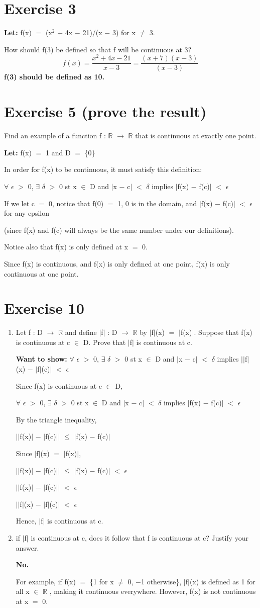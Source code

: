 \documentclass{article}
\newcommand{\mt}[1]{\ensuremath{#1}}
\newcommand\bsc[2][\DefaultOpt]{%
  \def\DefaultOpt{#2}%
  \section[#1]{#2}%
}
\newcommand{\balist}{\begin{enumerate}[label=\alph*.]}
\newcommand{\elist}{\end{enumerate}}
\newcommand{\lt}[1]{\textbf{Let: } #1}
\newcommand{\wts}[1]{\textbf{Want to show: } #1}
\newcommand{\br}{\mt{\mathbb{R}} }       %
\newcommand{\ep}{\mt{\epsilon} }         %
\newcommand{\fa}{\mt{\forall} }          %
\newcommand{\dta}{\mt{\delta} }
\newcommand{\mem}{\mt{\in} }
\newcommand{\exs}{\mt{\exists} }
\newcommand{\lra}{ \mt{\longrightarrow} } %
\newcommand{\av}[1]{\mt{|}#1\mt{|}}  %
\newcommand{\prn}[1]{(#1)}
\newcommand{\bk}[1]{\{#1\}}
\newcommand{\ps}{\mt{+} }
\newcommand{\ms}{\mt{-} }
\newcommand{\ls}{\mt{<} }
\newcommand{\gr}{\mt{>} }
\newcommand{\lse}{\mt{\leq} }
\newcommand{\eql}{\mt{=} }
\newcommand{\uf}[2]{#1\mt{^{#2}}}
\newcommand{\eqn}[1]{\[#1\]}
\begin{document}
\bsc{Exercise 3}{

\lt{f(x) \eql \prn{\uf{x}{2} \ps 4x \ms 21}/\prn{x \ms 3} for x $\neq$ 3.}

How should f(3) be defined so that f will be continuous at 3?
\eqn{f(x) = \frac{x^2 + 4x - 21}{x - 3} = \frac{(x + 7)(x - 3)}{(x - 3)}}
\textbf{f(3) should be defined as 10.}

}

\newpage

\bsc{Exercise 5 (prove the result)}{

Find an example of a function f : \br \lra \br that is continuous at exactly one point.

\lt{f(x) \eql 1 and D \eql \bk{0}}

In order for f(x) to be continuous, it must satisfy this definition:

\fa \ep \gr 0, \exs \dta \gr 0 st x \mem D and \av{x \ms c} \ls \dta implies \av{f(x) \ms f(c)} \ls \ep

If we let c \eql 0, notice that f(0) \eql 1, 0 is in the domain, and \av{f(x) \ms f(c)} \ls \ep for any epsilon

(since f(x) and f(c) will always be the same number under our definitions).

Notice also that f(x) is only defined at x \eql 0.

Since f(x) is continuous, and f(x) is only defined at one point, f(x) is only continuous at one point.
}

\bsc{Exercise 10}{

\balist
\item Let f : D \lra \br and define \av{f} : D \lra \br by \av{f}(x) \eql \av{f(x)}. Suppose that f(x) is continuous at c \mem D. Prove that \av{f} is continuous at c.
	
	\wts{\fa \ep \gr 0, \exs \dta \gr 0 st x \mem D and \av{x \ms c} \ls \dta implies \av{\av	{f}(x) \ms \av{f}(c)} \ls \ep}
	
	Since f(x) is continuous at c \mem D,
	
	\fa \ep \gr 0, \exs \dta \gr 0 st x \mem D and \av{x \ms c} \ls \dta implies \av{f(x) \ms f(c)} \ls \ep
	
	By the triangle inequality,
	
	\av{\av{f(x)} \ms \av{f(c)}} \lse \av{f(x) \ms f(c)}
	
	Since \av{f}(x) \eql \av{f(x)},
	
	\av{\av{f(x)} \ms \av{f(c)}} \lse \av{f(x) \ms f(c)} \ls \ep
	
	\av{\av{f(x)} \ms \av{f(c)}} \ls \ep
	
	\av{\av{f}(x) \ms \av{f}(c)} \ls \ep
	
	Hence, \av{f} is continuous at c.
	
	
\item if \av{f} is continuous at c, does it follow that f is continuous at c? Justify your answer.
	
	\textbf{No.}
	
	For example, if f(x) \eql \bk{1 for x $\neq$ 0, $-$1 otherwise}, \av{f}(x) is defined as 1 for all x \mem \br, making it continuous everywhere. However, f(x) is not continuous at x \eql 0.
\elist

}
\end{document}
